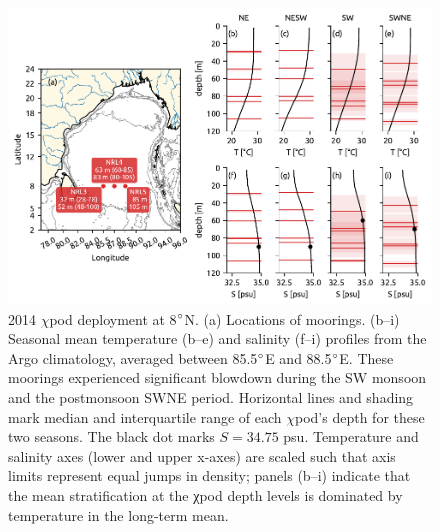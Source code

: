 \documentclass[onecol]{ametsoc}
\begin{document}
\begin{figure}
\centering
\includegraphics[width=\textwidth]{figure3-map.pdf}
\caption{\label{fig:map}
2014 \(\chi\)pod deployment at 8\(\degree\)N. (a) Locations of moorings. (b--i) Seasonal mean temperature (b--e) and salinity (f--i) profiles from the Argo climatology, averaged between 85.5\(\degree\)E and 88.5\(\degree\)E. These moorings experienced significant blowdown during the SW monsoon and the postmonsoon SWNE period. Horizontal lines and shading mark median and interquartile range of each \(\chi\)pod's depth for these two seasons. The black dot marks \(S=34.75\) psu. Temperature and salinity axes (lower and upper x-axes) are scaled such that axis limits represent equal jumps in density; panels (b--i) indicate that the mean stratification at the χpod depth levels is dominated by temperature in the long-term mean.}
\end{figure}
\end{document}
